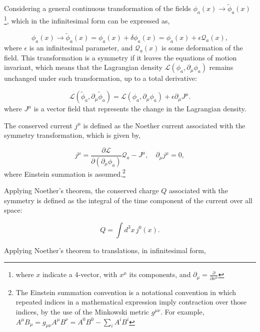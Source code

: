 \documentclass[11pt,a4paper,twoside,pdf]{article}
\numberwithin{equation}{section}
\begin{document}
Considering a general continuous transformation of the fields \(\phi_a(x) \rightarrow \tilde{\phi}_a(x)\)
\footnote{where $x$ indicate a 4-vector, with $x^\mu$ its components, and 
$\partial_\mu = \frac{\partial}{\partial x^\mu}$}, 
which in the infinitesimal form can be expressed as,

\begin{equation}
    \phi_a(x) \to \tilde{\phi}_a (x) = \phi_a(x) + \delta\phi_a(x) = \phi_a(x) + 
    \epsilon \mathcal{Q}_a(x),
\end{equation}
where \(\epsilon\) is an infinitesimal parameter, and \(\mathcal{Q}_a(x)\) is some 
deformation of the field. This transformation is a symmetry if it leaves the
equations of motion invariant, which means that the Lagrangian density
\(\mathcal{L}(\phi_a, \partial_\mu \phi_a)\) remains unchanged under such transformation,
up to a total derivative:

\begin{equation}
    \mathcal{L}(\tilde{\phi}_a, \partial_\mu \tilde{\phi}_a) = 
    \mathcal{L}(\phi_a, \partial_\mu \phi_a) + \epsilon \partial_\mu J^\mu.
    \label{eq:lagrangian_symmetry}
\end{equation}
where \(J^\mu\) is a vector field that represents the change in the Lagrangian density.

The conserved current \(j^\mu\) is defined as the Noether current associated with the
symmetry transformation, which is given by,

\begin{equation}
    j^\mu = \frac{\partial \mathcal{L}}{\partial (\partial_\mu \phi_a)} \mathcal{Q}_a 
    - J^\mu, \quad \partial_\mu j^\mu = 0,
\end{equation}
where Einstein summation is assumed.\footnote{
    The Einstein summation convention is a notational convention in which repeated 
    indices in a mathematical expression imply contraction over those indices, by the 
    use of the Minkowski metric \(g^{\mu\nu}\). For example, $A^\mu B_\mu = g_{\mu\nu} 
    A^\mu B^\nu = A^0 B^0 - \sum_i A^i B^i$ 
}

Applying Noether's theorem, the conserved charge \(Q\) associated with the symmetry is 
defined as the integral of the time component of the current over all space:

\begin{equation}
    Q = \int d^3x \, j^0(x).
\end{equation}

Applying Noether's theorem to translations, in infinitesimal form, 
\end{document}
